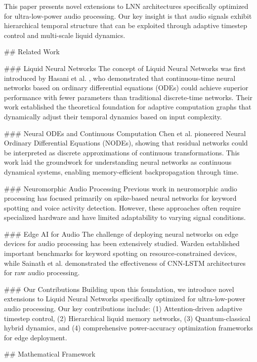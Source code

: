 \documentclass[conference]{IEEEtran}
\begin{document}
This paper presents novel extensions to LNN architectures specifically optimized for ultra-low-power 
audio processing. Our key insight is that audio signals exhibit hierarchical temporal structure 
that can be exploited through adaptive timestep control and multi-scale liquid dynamics.

## Related Work

### Liquid Neural Networks
The concept of Liquid Neural Networks was first introduced by Hasani et al. \cite{hasani2021liquid}, 
who demonstrated that continuous-time neural networks based on ordinary differential equations (ODEs) 
could achieve superior performance with fewer parameters than traditional discrete-time networks. 
Their work established the theoretical foundation for adaptive computation graphs that dynamically 
adjust their temporal dynamics based on input complexity.

### Neural ODEs and Continuous Computation
Chen et al. \cite{chen2018neural} pioneered Neural Ordinary Differential Equations (NODEs), 
showing that residual networks could be interpreted as discrete approximations of continuous 
transformations. This work laid the groundwork for understanding neural networks as continuous 
dynamical systems, enabling memory-efficient backpropagation through time.

### Neuromorphic Audio Processing
Previous work in neuromorphic audio processing has focused primarily on spike-based neural 
networks for keyword spotting and voice activity detection. However, these approaches often 
require specialized hardware and have limited adaptability to varying signal conditions.

### Edge AI for Audio
The challenge of deploying neural networks on edge devices for audio processing has been 
extensively studied. Warden \cite{warden2018speech} established important benchmarks for 
keyword spotting on resource-constrained devices, while Sainath et al. \cite{sainath2015learning} 
demonstrated the effectiveness of CNN-LSTM architectures for raw audio processing.

### Our Contributions
Building upon this foundation, we introduce novel extensions to Liquid Neural Networks 
specifically optimized for ultra-low-power audio processing. Our key contributions include:
(1) Attention-driven adaptive timestep control, (2) Hierarchical liquid memory networks, 
(3) Quantum-classical hybrid dynamics, and (4) comprehensive power-accuracy optimization 
frameworks for edge deployment.

## Mathematical Framework
\end{document}
